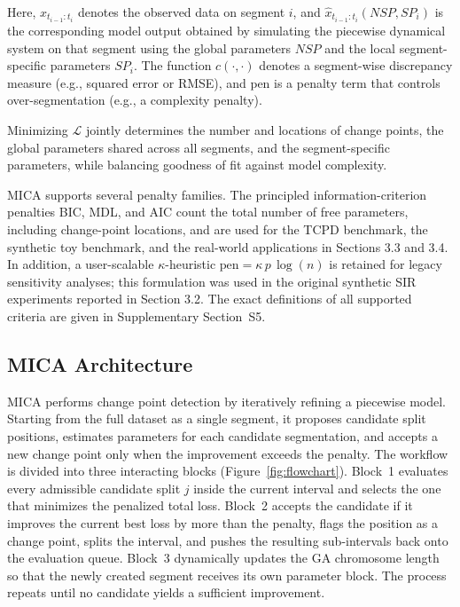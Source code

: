 \documentclass[10pt,letterpaper]{article}
\begin{document}
Here, \(x_{t_{i-1}:t_i}\) denotes the observed data on segment \(i\), and
\(\hat{x}_{t_{i-1}:t_i}(NSP, SP_i)\) is the corresponding model output
obtained by simulating the piecewise dynamical system on that segment
using the global parameters \(NSP\) and the local segment-specific
parameters \(SP_i\). The function \(c(\cdot,\cdot)\) denotes a
segment-wise discrepancy measure (e.g., squared error or RMSE), and
\(\mathrm{pen}\) is a penalty term that controls over-segmentation (e.g.,
a complexity penalty).

Minimizing \(\mathcal{L}\) jointly determines the number and locations of change
points, the global parameters shared across all segments, and the
segment-specific parameters, while balancing goodness of fit against
model complexity.

MICA supports several penalty families. The principled information-criterion penalties BIC, MDL, and AIC count the total number of free parameters, including change-point locations, and are used for the TCPD benchmark, the synthetic toy benchmark, and the real-world applications in Sections 3.3 and 3.4. In addition, a user-scalable $\kappa$-heuristic $\mathrm{pen}=\kappa\,p\,\log(n)$ is retained for legacy sensitivity analyses; this formulation was used in the original synthetic SIR experiments reported in Section 3.2. The exact definitions of all supported criteria are given in Supplementary Section~S5.


\subsection*{MICA Architecture}

MICA performs change point detection by iteratively refining a piecewise model. Starting from the full dataset as a single segment, it proposes candidate split positions, estimates parameters for each candidate segmentation, and accepts a new change point only when the improvement exceeds the penalty. The workflow is divided into three interacting blocks (Figure~\ref{fig:flowchart}). Block~1 evaluates every admissible candidate split $j$ inside the current interval and selects the one that minimizes the penalized total loss. Block~2 accepts the candidate if it improves the current best loss by more than the penalty, flags the position as a change point, splits the interval, and pushes the resulting sub-intervals back onto the evaluation queue. Block~3 dynamically updates the GA chromosome length so that the newly created segment receives its own parameter block. The process repeats until no candidate yields a sufficient improvement.
\end{document}
